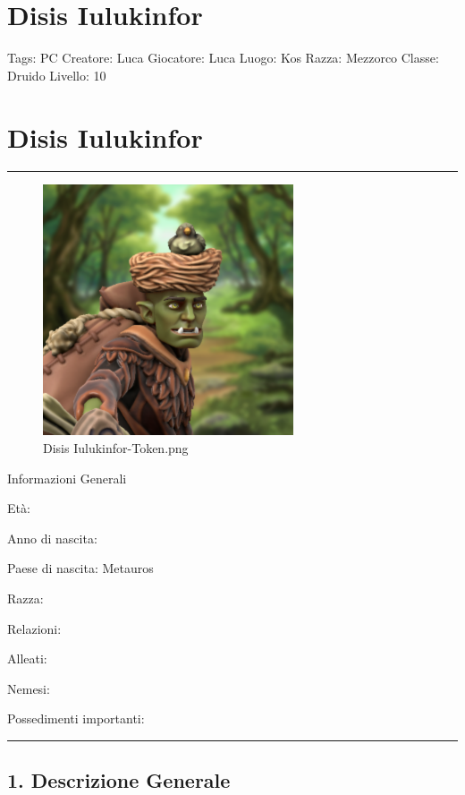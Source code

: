 \section{Disis Iulukinfor}\label{disis-iulukinfor}

Tags: PC Creatore: Luca Giocatore: Luca Luogo: Kos Razza: Mezzorco
Classe: Druido Livello: 10

\section{Disis Iulukinfor}\label{disis-iulukinfor-1}

\begin{center}\rule{0.5\linewidth}{0.5pt}\end{center}

\begin{figure}
\centering
\includegraphics{Disis_Iulukinfor-Token.png}
\caption{Disis Iulukinfor-Token.png}
\end{figure}

Informazioni Generali

Età:

Anno di nascita:

Paese di nascita: Metauros

Razza:

Relazioni:

Alleati:

Nemesi:

Possedimenti importanti:

\begin{center}\rule{0.5\linewidth}{0.5pt}\end{center}

\subsection{1. Descrizione Generale}\label{descrizione-generale}

